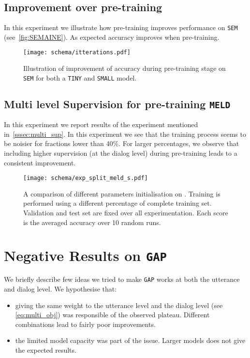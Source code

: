\documentclass[11pt,a4paper]{article}
\begin{document}
\subsection{Improvement over pre-training}
In this experiment we illustrate how pre-training improves performance on \texttt{SEM} (see~\autoref{fig:SEMAINE}). As expected accuracy improves when pre-training.  

\begin{figure}
  \centering
  \texttt{[image: schema/itterations.pdf]}
\caption{Illustration of improvement of accuracy during pre-training stage on \texttt{SEM} for both a \texttt{TINY} and \texttt{SMALL} model.}
  \label{fig:SEMAINE}
\end{figure}

\subsection{Multi level Supervision for pre-training \texttt{MELD}} In this experiment we report results of the experiment mentioned in~\autoref{sssec:multi_sup}. In this experiment we see that the training process seems to be noisier for fractions lower than 40\%. For larger percentages, we observe that including higher supervision (at the dialog level) during pre-training leads to a consistent improvement.
\begin{figure}
  \centering
  \texttt{[image: schema/exp\_split\_meld\_s.pdf]}
    \caption{A comparison of different parameters initialisation on . Training is performed using a different percentage of complete training set. Validation and test set are fixed over all experimentation. Each score  is the averaged accuracy over 10 random runs.}
    \label{fig:exp_split_meld_s}
\end{figure}




\section{Negative Results on \texttt{GAP}}
\label{sec:sup_neg_res}
We briefly describe few ideas we tried to make \texttt{GAP} works at both the utterance and dialog level. We hypothesise that:
\begin{itemize}
    \item giving the same weight to the utterance level and the dialog level (see \autoref{eq:multi_obj}) was responsible of the observed plateau. Different combinations lead to fairly poor improvements.
    \item the limited model capacity was part of the issue. Larger models does not give the expected results.
\end{itemize}
 
\end{document}
